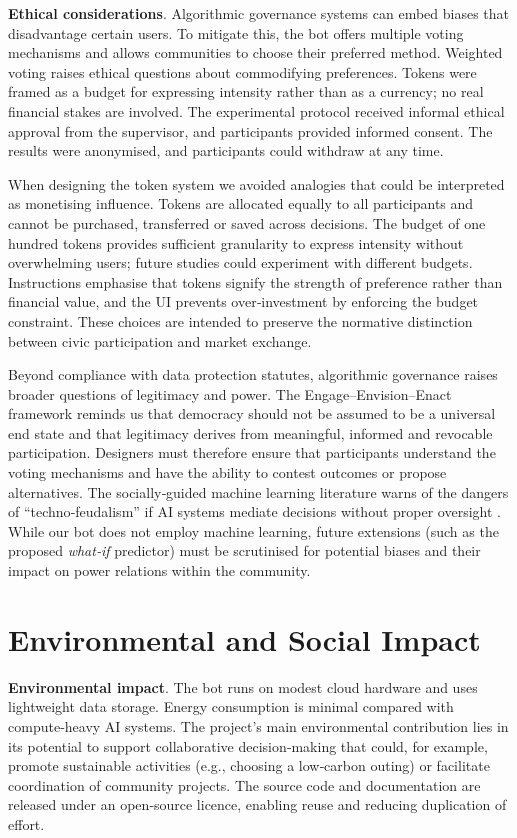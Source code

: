 \textbf{Ethical considerations}.  Algorithmic governance systems can
embed biases that disadvantage certain users.  To mitigate this, the bot
offers multiple voting mechanisms and allows communities to choose their
preferred method.  Weighted voting raises ethical questions about
commodifying preferences.  Tokens were framed as a budget for expressing
intensity rather than as a currency; no real financial stakes are
involved.  The experimental protocol received informal ethical approval
from the supervisor, and participants provided informed consent.  The
results were anonymised, and participants could withdraw at any time.

When designing the token system we avoided analogies that could be
interpreted as monetising influence.  Tokens are allocated equally to
all participants and cannot be purchased, transferred or saved across
decisions.  The budget of one hundred tokens provides sufficient
granularity to express intensity without overwhelming users; future
studies could experiment with different budgets.  Instructions
emphasise that tokens signify the strength of preference rather than
financial value, and the UI prevents over‑investment by
enforcing the budget constraint.  These choices are intended to
preserve the normative distinction between civic participation and
market exchange.

Beyond compliance with data protection statutes, algorithmic governance
raises broader questions of legitimacy and power.  The
Engage–Envision–Enact framework reminds us that democracy should not
be assumed to be a universal end state and that legitimacy derives from
meaningful, informed and revocable participation.  Designers must
therefore ensure that participants understand the voting mechanisms and
have the ability to contest outcomes or propose alternatives.  The
socially‑guided machine learning literature warns of the dangers of
``techno‑feudalism'' if AI systems mediate decisions without proper
oversight \cite{Mertzani2025SGML}.  While our bot does not employ
machine learning, future extensions (such as the proposed
\emph{what‑if} predictor) must be scrutinised for potential biases and
their impact on power relations within the community.

\section{Environmental and Social Impact}

\textbf{Environmental impact}.  The bot runs on modest cloud hardware
and uses lightweight data storage.  Energy consumption is minimal
compared with compute‑heavy AI systems.  The project’s main environmental
contribution lies in its potential to support collaborative decision‑making
that could, for example, promote sustainable activities (e.g., choosing a
low‑carbon outing) or facilitate coordination of community projects.  The
source code and documentation are released under an open‑source licence,
enabling reuse and reducing duplication of effort.

